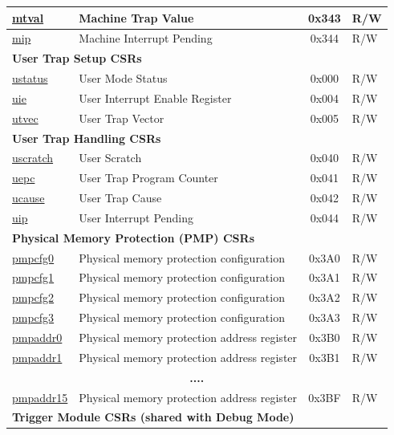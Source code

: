 \begin{longtable}{ | p{4.0cm} | p{8.4cm} | c | l | }
\hyperref[regdesc:MTVAL]{mtval} & Machine Trap Value & 0x343 & R/W \\\hline
\hyperref[regdesc:MIP]{mip} & Machine Interrupt Pending & 0x344 & R/W \\\hline
\multicolumn{4}{|l|}{\textbf{User Trap Setup CSRs}} \\\hline
\hyperref[regdesc:USTATUS]{ustatus} & User Mode Status & 0x000 & R/W \\\hline
\hyperref[regdesc:UIE]{uie} & User Interrupt Enable Register & 0x004 & R/W \\\hline
\hyperref[regdesc:UTVEC]{utvec} & User Trap Vector & 0x005 & R/W \\\hline
\multicolumn{4}{|l|}{\textbf{User Trap Handling CSRs}} \\\hline
\hyperref[regdesc:USCRATCH]{uscratch} & User Scratch & 0x040 & R/W \\\hline
\hyperref[regdesc:UEPC]{uepc} & User Trap Program Counter & 0x041 & R/W \\\hline
\hyperref[regdesc:UCAUSE]{ucause} & User Trap Cause & 0x042 & R/W \\\hline
\hyperref[regdesc:UIP]{uip} & User Interrupt Pending & 0x044 & R/W \\\hline
\multicolumn{4}{|l|}{\textbf{Physical Memory Protection (PMP) CSRs}} \\\hline\hyperref[sec:riscvcpu-pmp-reg-desc]{pmpcfg0} & Physical memory protection configuration & 0x3A0 & R/W \\\hline
\hyperref[sec:riscvcpu-pmp-reg-desc]{pmpcfg1} & Physical memory protection configuration & 0x3A1 & R/W \\\hline
\hyperref[sec:riscvcpu-pmp-reg-desc]{pmpcfg2} & Physical memory protection configuration & 0x3A2 & R/W \\\hline
\hyperref[sec:riscvcpu-pmp-reg-desc]{pmpcfg3} & Physical memory protection configuration & 0x3A3 & R/W \\\hline
\hyperref[sec:riscvcpu-pmp-reg-desc]{pmpaddr0} & Physical memory protection address register & 0x3B0 & R/W \\\hline
\hyperref[sec:riscvcpu-pmp-reg-desc]{pmpaddr1} & Physical memory protection address register & 0x3B1 & R/W \\\hline
\multicolumn{4}{|c|}{\textbf{....}} \\\hline
\hyperref[sec:riscvcpu-pmp-reg-desc]{pmpaddr15} & Physical memory protection address register & 0x3BF & R/W \\\hline
\multicolumn{4}{|l|}{\textbf{Trigger Module CSRs (shared with Debug Mode)}} \\\hline

\end{longtable}

